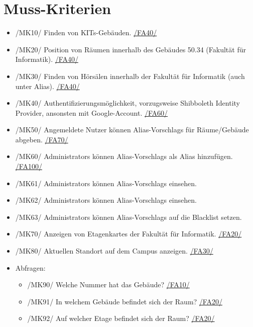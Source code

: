 \section{Muss-Kriterien}

\begin{itemize}

    \item{/MK10/} \label{/MK10/}Finden von \Glspl{KIT}-Gebäuden. \hyperref[/FA40/]{/FA40/}
    \item{/MK20/} \label{/MK20/}Position von Räumen innerhalb des Gebäudes 50.34 (Fakultät für Informatik). \hyperref[/FA40/]{/FA40/}
    \item{/MK30/} \label{/MK30/}Finden von Hörsälen innerhalb der Fakultät für Informatik (auch unter Alias). \hyperref[/FA40/]{/FA40/}
    \item{/MK40/} \label{/MK40/}Authentifizierungsmöglichkeit, vorzugsweise Shibboleth Identity Provider, ansonsten mit Google-Account. \hyperref[/FA60/]{/FA60/}
    \item{/MK50/} \label{/MK50/}Angemeldete Nutzer können \Glspl{Alias-Vorschlag} für Räume/Gebäude abgeben. \hyperref[/FA70/]{/FA70/}
    \item{/MK60/} \label{/MK60/}\Glspl{Administrator} können \Glspl{Alias-Vorschlag} als \Gls{Alias} hinzufügen. \hyperref[/FA100/]{/FA100/}
    \item{/MK61/} \label{/MK61/}\Glspl{Administrator} können \Glspl{Alias-Vorschlag} einsehen.
    \item{/MK62/} \label{/MK62/}\Glspl{Administrator} können \Glspl{Alias-Vorschlag} einsehen.
    \item{/MK63/} \label{/MK63/}\Glspl{Administrator} können \Glspl{Alias-Vorschlag} auf die \Gls{Blacklist} setzen.
    \item{/MK70/} \label{/MK70/}Anzeigen von \Glspl{Etagenkarte} der Fakultät für Informatik. \hyperref[/FA20/]{/FA20/}
    \item{/MK80/} \label{/MK80/}Aktuellen Standort auf dem \Gls{Campus} anzeigen. \hyperref[/FA30/]{/FA30/}
    \item Abfragen:
        \begin{itemize}
            \item{/MK90/} \label{/MK90/}Welche Nummer hat das Gebäude? \hyperref[/FA10/]{/FA10/}
            \item{/MK91/} \label{/MK91/}In welchem Gebäude befindet sich der Raum? \hyperref[/FA20/]{/FA20/}
            \item{/MK92/} \label{/MK92/}Auf welcher Etage befindet sich der Raum? \hyperref[/FA20/]{/FA20/}

\end{itemize}
\end{itemize}
